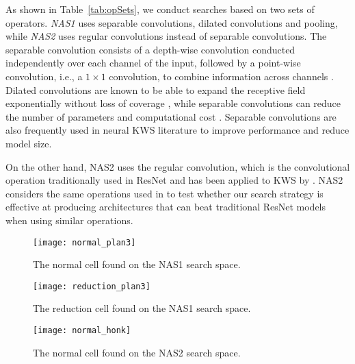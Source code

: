 \documentclass[a4paper]{article}
\begin{document}
As shown in Table~\ref{tab:opSets}, we conduct searches based on two sets of operators. \textit{NAS1} uses separable convolutions, dilated convolutions and pooling, while \textit{NAS2} uses regular convolutions instead of separable convolutions. 
The separable convolution consists of a depth-wise convolution conducted independently over each channel of the input, followed by a point-wise convolution, i.e., a $1 \times 1$ convolution, to combine information across channels \cite{chollet2017xception,chen2018encoder}. 
Dilated convolutions are known to be able to expand the receptive field exponentially without loss of coverage \cite{yu2015multi}, while separable convolutions can reduce the number of parameters and computational cost \cite{kaiser2017depthwise}.  
Separable convolutions are also frequently used in neural KWS literature \cite{mittermaier2019small,majumdar2020matchboxnet} to improve performance and reduce model size.


On the other hand, NAS2 uses the regular convolution, which is the convolutional operation traditionally used in ResNet and has been applied to KWS by \cite{tang2018deep}.
NAS2 considers the same operations used in \cite{tang2018deep} to test whether our search strategy is effective at producing architectures that can beat traditional ResNet models \cite{tang2018deep} when using similar operations. 






\begin{figure}[!t]
    \centering
    \texttt{[image: normal\_plan3]}
    \vspace{-6.5mm}
    \caption{The normal cell found on the NAS1 search space.}
    \label{fig:normal_plan3}
\end{figure}

\begin{figure}[!t]
    \centering
    \texttt{[image: reduction\_plan3]}
    \vspace{-6.5mm}
    \caption{The reduction cell found on the NAS1 search space.}
    \label{fig:reduction_plan3}
\end{figure}



\begin{figure}[!t]
    \centering
    \texttt{[image: normal\_honk]}
    \vspace{-6.5mm}
    \caption{The normal cell found on the NAS2 search space.}
    \label{fig:normal_honk}
\end{figure}
\end{document}

